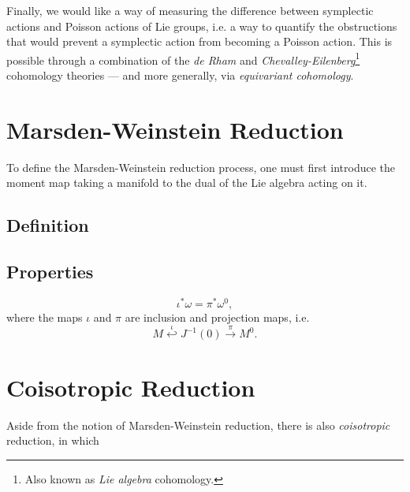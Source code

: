 Finally, we would like a way of measuring the difference between symplectic actions and Poisson actions of Lie groups, i.e. a way to quantify the obstructions that would prevent a symplectic action from becoming a Poisson action. This is possible through a combination of the \emph{de Rham} and \emph{Chevalley-Eilenberg}\footnote{Also known as \emph{Lie algebra} cohomology.} cohomology theories --- and more generally, via \emph{equivariant cohomology}.
















\section{Marsden-Weinstein Reduction}
To define the Marsden-Weinstein reduction process, one must first introduce the moment map taking a manifold to the dual of the Lie algebra acting on it.


\subsection{Definition}
\subsection{Properties}
$$
\iota^*\omega = \pi^*\omega^0,
$$
where the maps $\iota$ and $\pi$ are inclusion and projection maps, i.e.
$$
M \overset{\iota}\hookleftarrow J^{-1}(0) \overset{\pi}\to M^0.
$$















\section{Coisotropic Reduction}
Aside from the notion of Marsden-Weinstein reduction, there is also \emph{coisotropic} reduction, in which






